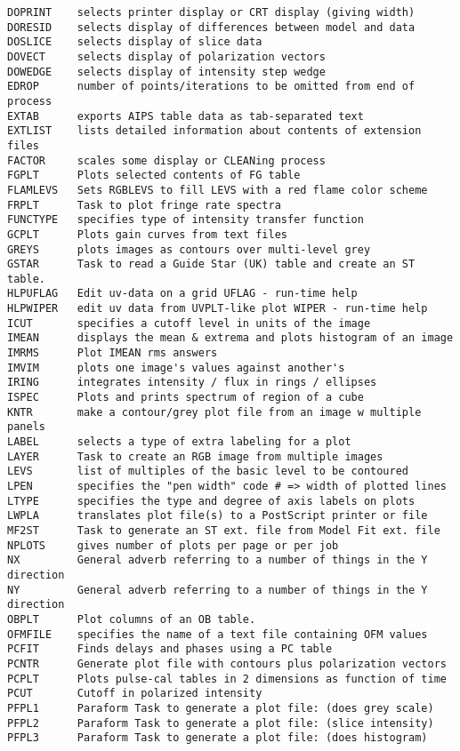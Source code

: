 \begin{verbatim}
DOPRINT    selects printer display or CRT display (giving width)
DORESID    selects display of differences between model and data
DOSLICE    selects display of slice data
DOVECT     selects display of polarization vectors
DOWEDGE    selects display of intensity step wedge
EDROP      number of points/iterations to be omitted from end of process
EXTAB      exports AIPS table data as tab-separated text
EXTLIST    lists detailed information about contents of extension files
FACTOR     scales some display or CLEANing process
FGPLT      Plots selected contents of FG table
FLAMLEVS   Sets RGBLEVS to fill LEVS with a red flame color scheme
FRPLT      Task to plot fringe rate spectra
FUNCTYPE   specifies type of intensity transfer function
GCPLT      Plots gain curves from text files
GREYS      plots images as contours over multi-level grey
GSTAR      Task to read a Guide Star (UK) table and create an ST table.
HLPUFLAG   Edit uv-data on a grid UFLAG - run-time help
HLPWIPER   edit uv data from UVPLT-like plot WIPER - run-time help
ICUT       specifies a cutoff level in units of the image
IMEAN      displays the mean & extrema and plots histogram of an image
IMRMS      Plot IMEAN rms answers
IMVIM      plots one image's values against another's
IRING      integrates intensity / flux in rings / ellipses
ISPEC      Plots and prints spectrum of region of a cube
KNTR       make a contour/grey plot file from an image w multiple panels
LABEL      selects a type of extra labeling for a plot
LAYER      Task to create an RGB image from multiple images
LEVS       list of multiples of the basic level to be contoured
LPEN       specifies the "pen width" code # => width of plotted lines
LTYPE      specifies the type and degree of axis labels on plots
LWPLA      translates plot file(s) to a PostScript printer or file
MF2ST      Task to generate an ST ext. file from Model Fit ext. file
NPLOTS     gives number of plots per page or per job
NX         General adverb referring to a number of things in the Y direction
NY         General adverb referring to a number of things in the Y direction
OBPLT      Plot columns of an OB table.
OFMFILE    specifies the name of a text file containing OFM values
PCFIT      Finds delays and phases using a PC table
PCNTR      Generate plot file with contours plus polarization vectors
PCPLT      Plots pulse-cal tables in 2 dimensions as function of time
PCUT       Cutoff in polarized intensity
PFPL1      Paraform Task to generate a plot file: (does grey scale)
PFPL2      Paraform Task to generate a plot file: (slice intensity)
PFPL3      Paraform Task to generate a plot file: (does histogram)

\end{verbatim}
